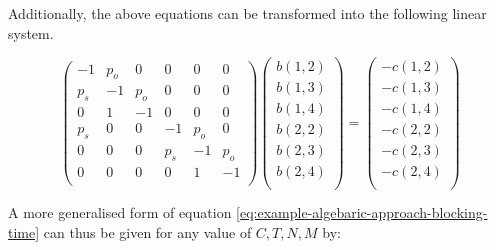 Additionally, the above equations can be transformed into the following linear system.

\begin{equation}\label{eq:example-algebaric-approach-blocking-time}
    \begin{pmatrix}
        -1 & p_o & 0 & 0 & 0 & 0 \\ %
        p_s & -1 & p_o & 0 & 0 & 0 \\ %
        0 & 1 & -1 & 0 & 0 & 0 \\ %
        p_s & 0 & 0 & -1 & p_o & 0\\ %
        0 & 0 & 0 & p_s & -1 & p_o \\ %
        0 & 0 & 0 & 0 & 1 & -1 \\ %
    \end{pmatrix}
    \begin{pmatrix}
        b(1,2) \\
        b(1,3) \\
        b(1,4) \\
        b(2,2) \\
        b(2,3) \\
        b(2,4) \\
    \end{pmatrix}
    = 
    \begin{pmatrix}
        -c(1,2) \\
        -c(1,3) \\
        -c(1,4) \\
        -c(2,2) \\
        -c(2,3) \\
        -c(2,4) \\
    \end{pmatrix}
\end{equation}

A more generalised form of equation \ref{eq:example-algebaric-approach-blocking-time}
can thus be given for any value of \(C,T,N,M\) by:

